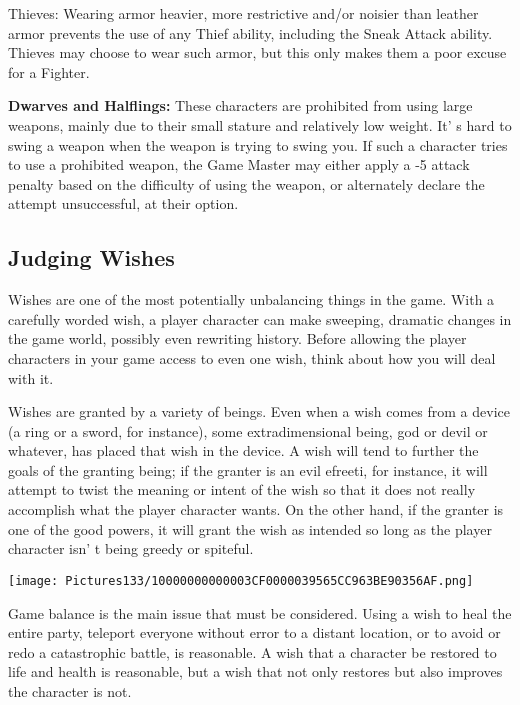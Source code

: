 \documentclass[a4paper,twoside,openany,10pt]{book}
\begin{document}
\begin{multicols}{2}
Thieves: Wearing armor heavier, more restrictive and/or noisier than leather armor prevents the use of any Thief ability, including the Sneak Attack ability. Thieves may choose to wear such armor, but this only makes them a poor excuse for a Fighter.

\textbf{Dwarves and Halflings:} These characters are prohibited from using large weapons, mainly due to their small stature and relatively low weight. It' s hard to swing a weapon when the weapon is trying to swing you. If such a character tries to use a prohibited weapon, the Game Master may either apply a -5 attack penalty based on the difficulty of using the weapon, or alternately declare the attempt unsuccessful, at their option.

\subsection{Judging Wishes}\label{judging-wishes}

Wishes are one of the most potentially unbalancing things in the game.  With a carefully worded wish, a player character can make sweeping, dramatic changes in the game world, possibly even rewriting history. Before allowing the player characters in your game access to even one wish, think about how you will deal with it.

Wishes are granted by a variety of beings. Even when a wish comes from a device (a ring or a sword, for instance), some extradimensional being, god or devil or whatever, has placed that wish in the device. A wish will tend to further the goals of the granting being; if the granter is an evil efreeti, for instance, it will attempt to twist the meaning or intent of the wish so that it does not really accomplish what the player character wants. On the other hand, if the granter is one of the good powers, it will grant the wish as intended so long as the player character isn' t being greedy or spiteful.

\begin{flushleft} \texttt{[image: Pictures133/10000000000003CF0000039565CC963BE90356AF.png]}  \end{flushleft}

Game balance is the main issue that must be considered. Using a wish to heal the entire party, teleport everyone without error to a distant location, or to avoid or redo a catastrophic battle, is reasonable. A wish that a character be restored to life and health is reasonable, but a wish that not only restores but also improves the character is not.


\end{multicols}
\end{document}
